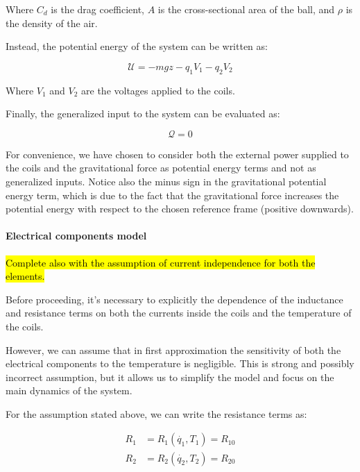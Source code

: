 Where $C_d$ is the drag coefficient, $A$ is the cross-sectional area of the ball, and $\rho$ is the density of the air.

Instead, the potential energy of the system can be written as:

\begin{equation}
    \mathcal{U} = -m g z - q_1 V_1 - q_2 V_2
    \label{eq:potential_energy}
\end{equation}

Where $V_1$ and $V_2$ are the voltages applied to the coils.

Finally, the generalized input to the system can be evaluated as:

\begin{equation}
    \mathcal{Q} = 0
    \label{eq:generalized_input}
\end{equation}

For convenience, we have chosen to consider both the external power supplied to the coils and the gravitational force as potential energy terms and not as generalized inputs.
Notice also the minus sign in the gravitational potential energy term, which is due to the fact that the gravitational force increases the potential energy with respect to the chosen reference frame (positive downwards).

\paragraph{Electrical components model}

\hl{Complete also with the assumption of current independence for both the elements.}

Before proceeding, it's necessary to explicitly the dependence of the inductance and resistance terms on both the currents inside the coils and the temperature of the coils.

However, we can assume that in first approximation the sensitivity of both the electrical components to the temperature is negligible.
This is strong and possibly incorrect assumption, but it allows us to simplify the model and focus on the main dynamics of the system.

For the assumption stated above, we can write the resistance terms as:

\begin{equation}
    \begin{aligned}
        R_1 & = R_1(\dot{q_1}, T_1) = R_{10} \\
        R_2 & = R_2(\dot{q_2}, T_2) = R_{20}
    \end{aligned}
    \label{eq:model_for_resistance}
\end{equation}

